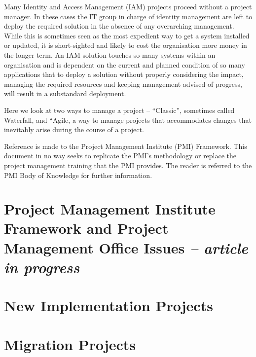 Many Identity and Access Management (IAM) projects proceed without a
project manager. In these cases the IT group in charge of identity
management are left to deploy the required solution in the absence of
any overarching management. While this is sometimes seen as the most
expedient way to get a system installed or updated, it is short-sighted
and likely to cost the organisation more money in the longer term. An
IAM solution touches so many systems within an organisation and is
dependent on the current and planned condition of so many applications
that to deploy a solution without properly considering the impact,
managing the required resources and keeping management advised of
progress, will result in a substandard deployment.

Here we look at two ways to manage a project -- ``Classic'', sometimes
called Waterfall, and ``Agile, a way to manage projects that
accommodates changes that inevitably arise during the course of a
project.

Reference is made to the Project Management Institute (PMI) Framework.
This document in no way seeks to replicate the PMI's methodology or
replace the project management training that the PMI provides. The
reader is referred to the PMI Body of Knowledge for further information.

\hypertarget{project-management-institute-framework-and-project-management-office-issues-article-in-progress}{%
\section{\texorpdfstring{Project Management Institute Framework and
Project Management Office Issues \emph{-- article in
progress}}{Project Management Institute Framework and Project Management Office Issues -- article in progress}}\label{project-management-institute-framework-and-project-management-office-issues-article-in-progress}}

\hypertarget{new-implementation-projects}{%
\section{New Implementation
Projects}\label{new-implementation-projects}}

\hypertarget{migration-projects}{%
\section{Migration Projects}\label{migration-projects}}

